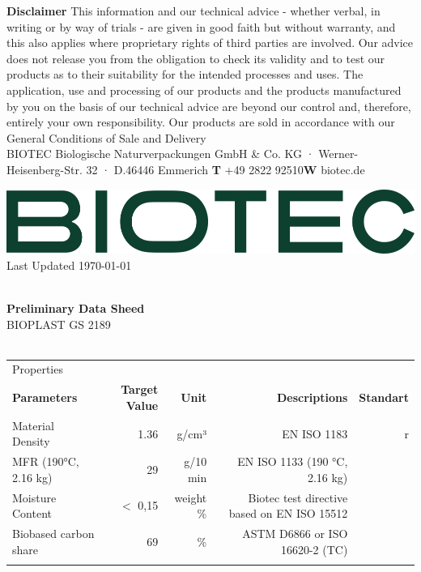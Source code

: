 \documentclass{article}
\begin{document}
\vspace*{\fill}
{\scriptsize
        \textbf{Disclaimer} This information and our technical advice - whether verbal, in writing or by way of trials - are given in good faith but without warranty, and this also applies where proprietary rights of third parties are involved. Our advice does not release you from the obligation to check its validity and to test our products as to their suitability for the intended processes and uses. The application, use and processing of our products and the products manufactured by you on the basis of our technical advice are beyond our control and, therefore, entirely your own responsibility. Our products are sold in accordance with our General Conditions of Sale and Delivery \\ 
 BIOTEC Biologische Naturverpackungen GmbH \& Co. KG · Werner-Heisenberg-Str. 32 · D.46446 Emmerich \hfill \textbf{T} +49 2822 92510\qquad \textbf{W} biotec.de}
\clearpage
\begin{flushleft}
\includegraphics[scale=0.20]{biotec}
\hfill\tiny Last Updated \today
\end{flushleft}
\begin{flushleft}
\hspace{1cm}\\
\textbf{Preliminary Data Sheed}\\
BIOPLAST GS 2189\\
\hspace{1cm}\\
\end{flushleft}
\begin{center}
\begin{tabularx}
{\textwidth}{X r  r  r  r }\rowcolor{color_title}Properties &  &  &  &  \\
\textbf{Parameters} & \textbf{Target Value} & \textbf{Unit} & \textbf{Descriptions} & \textbf{Standart} \\
Material Density  & 1.36 & g/cm³ & EN ISO 1183 & r \\
\arrayrulecolor{line_color}\hline
MFR (190°C, 2.16 kg) & 29 & g/10 min & EN ISO 1133 (190 °C, 2.16 kg) &  \\
\arrayrulecolor{line_color}\hline
Moisture Content & \(<\) 0,15 & weight \% & Biotec test directive based on EN ISO 15512 &  \\
\arrayrulecolor{line_color}\hline
Biobased carbon share & 69 & \% & ASTM D6866 or ISO 16620-2 (TC) &  \\
\arrayrulecolor{line_color}\hline

\end{tabularx}
\end{center}
\end{document}

